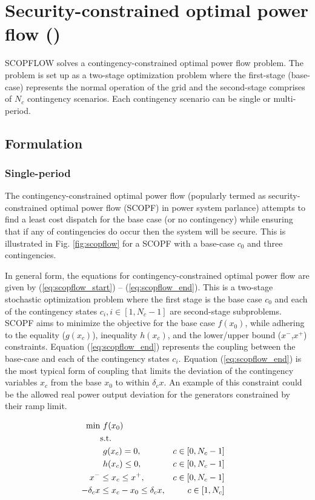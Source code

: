 \chapter{Security-constrained optimal power flow (\scopflow)}\label{chap:scopflow}
SCOPFLOW solves a contingency-constrained optimal power flow problem. The problem is set up as a two-stage optimization problem where the first-stage (base-case) represents the normal operation of the grid and the second-stage comprises of $N_c$ contingency scenarios. Each contingency scenario can be single or multi-period.

\section{Formulation}

\subsection{Single-period}

The contingency-constrained optimal power flow (popularly termed as security-constrained optimal power flow (SCOPF) in power system parlance) attempts to find a least cost dispatch for the base case (or no contingency) while ensuring that if any of contingencies do occur then the system will be secure. This is illustrated in Fig. \ref{fig:scopflow} for a SCOPF with a base-case $c_0$ and three contingencies.




In general form, the equations for contingency-constrained optimal power flow are given by
(\ref{eq:scopflow_start}) -- (\ref{eq:scopflow_end}). This is a two-stage stochastic optimization problem where the first stage is the base case $c_0$ and each of the contingency states $c_i, i \in [1,N_c-1]$ are second-stage subproblems. SCOPF aims to minimize the objective for the base case $f(x_0)$, while adhering to the equality ($g(x_c)$), inequality $h(x_c)$, and the lower/upper bound ($x^-$,$x^+$) constraints. Equation (\ref{eq:scopflow_end}) represents the coupling between the base-case and each of the contingency states $c_i$. Equation (\ref{eq:scopflow_end}) is the most typical form of coupling that limits the deviation of the contingency variables $x_c$ from the base $x_0$ to within $\delta_c{x}$. An example of this constraint could be the allowed real power output deviation for the generators constrained by their ramp limit.


\begin{align}
\centering
\text{min}&~f(x_0)&  \label{eq:scopflow_start}\\
&\text{s.t.}& \nonumber \\
&~g(x_c) = 0,                             &c \in \left[0,N_c-1\right]& \\
&~h(x_c) \le 0,                           &c \in \left[0,N_c-1\right]& \\
x^- & \le x_c \le x^+,                     &c\in \left[0,N_c-1\right]& \\
-\delta_c{x} & \le x_c - x_0 \le \delta_c{x},&c \in \left[1,N_c\right]&
\label{eq:scopflow_end}
\end{align}

